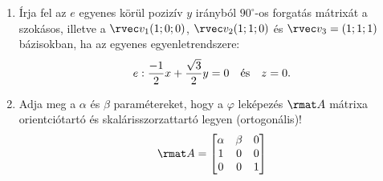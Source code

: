 \documentclass[a4paper, 12pt]{scrartcl}
\begin{document}
\begin{enumerate}
  \item Írja fel az $e$ egyenes körül pozizív $y$ irányból $90^\circ$-os
        forgatás mátrixát a szokásos, illetve a $\rvec v_1(1; 0; 0)$,
        $\rvec v_2(1; 1; 0)$ és $\rvec v_3 = (1; 1; 1)$ bázisokban, ha az
        egyenes egyenletrendszere:
        $$
          e:
          \frac{-1}{2} x + \frac{\sqrt{3}}{2} y = 0
          \quad \text{és} \quad
          z = 0
          \text.
        $$

  \item Adja meg a $\alpha$ és $\beta$ paramétereket, hogy a $\varphi$ leképezés
        $\rmat A$ mátrixa orientciótartó és skalárisszorzattartó legyen
        (ortogonális)!
        $$
          \rmat A = \begin{bmatrix}
            \alpha & \beta & 0 \\
            1      & 0     & 0 \\
            0      & 0     & 1
          \end{bmatrix}
        $$
\end{enumerate}
\end{document}
